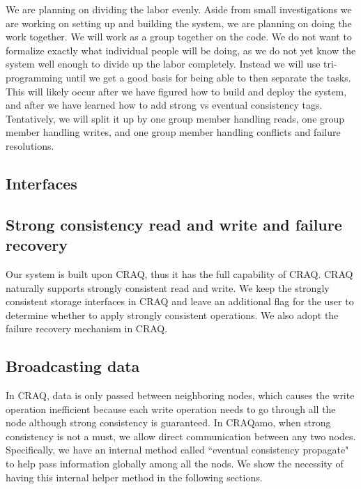 We are planning on dividing the labor evenly.  Aside from small investigations we are working on setting up and building the system, we are planning on doing the work together.  We will work as a group together on the code.  We do not want to formalize exactly what individual people will be doing, as we do not yet know the system well enough to divide up the labor completely.  Instead we will use tri-programming until we get a good basis for being able to then separate the tasks.  This will likely occur after we have figured how to build and deploy the system, and after we have learned how to add strong vs eventual consistency tags.  Tentatively, we will split it up by one group member handling reads, one group member handling writes, and one group member handling conflicts and failure resolutions.

\subsection{Interfaces}

\subsection{Strong consistency read and write and  failure recovery}
Our system is built upon CRAQ, thus it has the full capability of CRAQ. CRAQ naturally supports strongly consistent read and write. We keep the strongly consistent storage interfaces in CRAQ and leave an additional flag for the user to determine whether to apply strongly consistent operations. We also adopt the failure recovery mechanism in CRAQ.

\subsection{Broadcasting data}
In CRAQ, data is only passed between neighboring nodes, which causes the write operation inefficient because each write operation needs to go through all the node although strong consistency is guaranteed. In CRAQamo, when strong consistency is not a must, we allow direct communication between any two nodes. Specifically, we have an internal method called ``eventual consistency propagate" to help pass information globally among all the nods. We show the necessity of having this internal helper method in the following sections.

